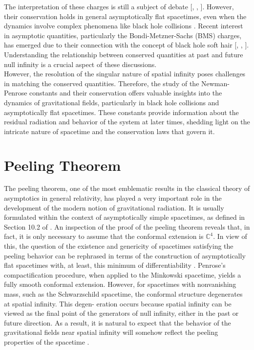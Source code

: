 The interpretation of these charges is still a subject of debate [\cite{PenRin84}, \cite{DaiVal02}, \cite{Bac10}]. However, their conservation holds in
general asymptotically flat spacetimes, even when the dynamics involve complex phenomena like black hole
collisions \cite{DaiVal02}. Recent interest in asymptotic quantities, particularly the Bondi-Metzner-Sachs (BMS) charges,
has emerged due to their connection with the concept of black hole soft hair [\cite{HawMalStr16}, \cite{HawMalStr17}, \cite{HeLyMi15}]. Understanding the relationship between conserved quantities at past and future null infinity is a crucial aspect of these discussions.\\

However, the resolution of the singular nature of spatial infinity poses challenges in matching the conserved
quantities.
Therefore, the study of the Newman-Penrose constants and their conservation offers valuable insights into the
dynamics of gravitational fields, particularly in black hole collisions and asymptotically flat spacetimes. These
constants provide information about the residual radiation and behavior of the system at later times, shedding
light on the intricate nature of spacetime and the conservation laws that govern it.\\

\section{Peeling Theorem}
\label{sec:Peeling Theorem}

The peeling theorem, one of the most emblematic results in the classical theory of asymptotics in general relativity, has played a very important role in the development of the modern notion of gravitational radiation. It
is usually formulated within the context of asymptotically simple spacetimes, as defined in Section 10.2 of \cite{Val16}.
An inspection of the proof of the peeling theorem reveals that, in fact, it is only necessary to assume that the
conformal extension is $\mathbb{C}^4$. In view of this, the question of the existence and genericity of spacetimes satisfying the peeling behavior can be rephrased in terms of the construction of asymptotically flat spacetimes with, at least, this minimum of differentiability \cite{GasVal17}. Penrose’s compactification procedure, when applied to the
Minkowski spacetime, yields a fully smooth conformal extension. However, for spacetimes with nonvanishing
mass, such as the Schwarzschild spacetime, the conformal structure degenerates at spatial infinity. This degen-
eration occurs because spatial infinity can be viewed as the final point of the generators of null infinity, either
in the past or future direction. As a result, it is natural to expect that the behavior of the gravitational fields near
spatial infinity will somehow reflect the peeling properties of the spacetime \cite{Pen65a}.\\

